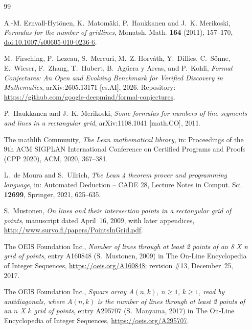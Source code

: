 \documentclass[11pt]{amsart}
\theoremstyle{plain}
\theoremstyle{definition}
\begin{document}
{\footnotesize
\begin{thebibliography}{99}

A.-M. Ernvall-Hytönen, K.~Matomäki, P.~Haukkanen and J.~K. Merikoski, \emph{Formulas for the number of gridlines}, Monatsh. Math. \textbf{164} (2011), 157--170, \href{https://doi.org/10.1007/s00605-010-0236-6}{doi:10.1007/s00605-010-0236-6}.

M.~Firsching, P.~Lezeau, S.~Mercuri, M.~Z. Horv\'ath, Y.~Dillies, C.~S\"onne, E.~Wieser, F.~Zhang, T.~Hubert, B.~Ag\"uera y Arcas, and P.~Kohli, \emph{Formal Conjectures: An Open and Evolving Benchmark for Verified Discovery in Mathematics}, arXiv:2605.13171 [cs.AI], 2026. Repository: \url{https://github.com/google-deepmind/formal-conjectures}.

P.~Haukkanen and J.~K. Merikoski, \emph{Some formulas for numbers of line segments and lines in a rectangular grid}, arXiv:1108.1041 [math.CO], 2011.

The mathlib Community, \emph{The Lean mathematical library}, in: Proceedings of the 9th ACM SIGPLAN International Conference on Certified Programs and Proofs (CPP 2020), ACM, 2020, 367--381.

L.~de Moura and S.~Ullrich, \emph{The Lean 4 theorem prover and programming language}, in: Automated Deduction -- CADE 28, Lecture Notes in Comput. Sci. \textbf{12699}, Springer, 2021, 625--635.

S.~Mustonen, \emph{On lines and their intersection points in a rectangular grid of points}, manuscript dated April~16, 2009, with later appendices, \url{http://www.survo.fi/papers/PointsInGrid.pdf}.

The OEIS Foundation Inc., \emph{Number of lines through at least 2 points of an 8 X n grid of points}, entry A160848 (S.~Mustonen, 2009) in The On-Line Encyclopedia of Integer Sequences, \url{https://oeis.org/A160848}; revision \#13, December~25, 2017.

The OEIS Foundation Inc., \emph{Square array $A(n,k)$, $n\ge1$, $k\ge1$, read by antidiagonals, where $A(n,k)$ is the number of lines through at least 2 points of an $n$ X $k$ grid of points}, entry A295707 (S.~Manyama, 2017) in The On-Line Encyclopedia of Integer Sequences, \url{https://oeis.org/A295707}.

\end{thebibliography}
}
\end{document}

